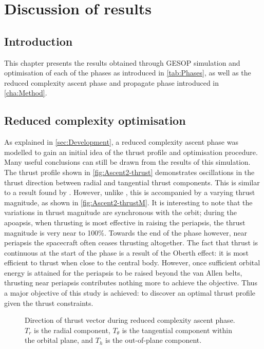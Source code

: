 \chapter{Discussion of results} \label{cha:Results}

\section{Introduction} \label{sec:Results-intro}

This chapter presents the results obtained through GESOP simulation and optimisation of each of the phases as introduced in \autoref{tab:Phases}, as well as the reduced complexity ascent phase and propagate phase introduced in \autoref{cha:Method}.

\section{Reduced complexity optimisation} \label{sec:Reduced-complexity}

As explained in \autoref{sec:Development}, a reduced complexity ascent phase was modelled to gain an initial idea of the thrust profile and optimisation procedure. Many useful conclusions can still be drawn from the results of this simulation. The thrust profile shown in \autoref{fig:Ascent2-thrust} demonstrates oscillations in the thrust direction between radial and tangential thrust components. This is similar to a result found by \textcite{Betts2003}. However, unlike \textcite{Betts2003}, this is accompanied by a varying thrust magnitude, as shown in \autoref{fig:Ascent2-thrustM}. It is interesting to note that the variations in thrust magnitude are synchronous with the orbit; during the apoapsis, when thrusting is most effective in raising the periapsis, the thrust magnitude is very near to 100\%. Towards the end of the phase however, near periapsis the spacecraft often ceases thrusting altogether. The fact that thrust is continuous at the start of the phase is a result of the Oberth effect: it is most efficient to thrust when close to the central body. However, once sufficient orbital energy is attained for the periapsis to be raised beyond the van Allen belts, thrusting near periapsis contributes nothing more to achieve the objective. Thus a major objective of this study is achieved: to discover an optimal thrust profile given the thrust constraints.

\begin{figure}
\centering
\def\svgwidth{\figurewidth}

\caption{Direction of thrust vector during reduced complexity ascent phase. $T_r$ is the radial component, $T_\theta$ is the tangential component within the orbital plane, and $T_h$ is the out-of-plane component.} \label{fig:Ascent2-thrust}
\end{figure}


